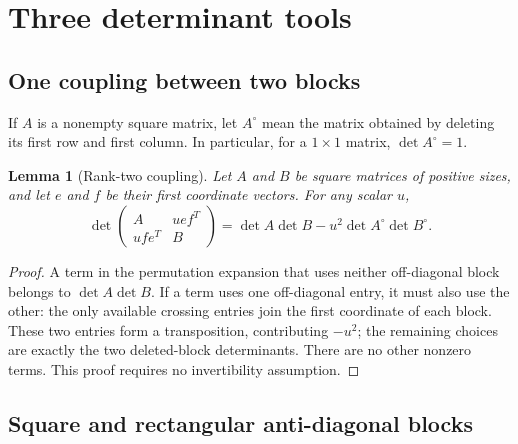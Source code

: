 \documentclass[11pt,a4paper]{article}
\numberwithin{equation}{section}
\newtheorem{lemma}[theorem]{Lemma}
\theoremstyle{definition}
\theoremstyle{remark}
\begin{document}
\section{Three determinant tools}\label{sec:tools}

\subsection{One coupling between two blocks}

If $A$ is a nonempty square matrix, let $A^{\circ}$ mean the matrix
obtained by deleting its first row and first column. In particular,
for a $1\times1$ matrix, $\det A^{\circ}=1$.

\begin{lemma}[Rank-two coupling]\label{lem:coupling}
Let $A$ and $B$ be square matrices of positive sizes, and let $e$ and $f$
be their first coordinate vectors. For any scalar $u$,
\begin{equation}\label{eq:coupling}
 \det\begin{pmatrix}A&u e f^T\\u f e^T&B\end{pmatrix}
 =\det A\det B-u^2\det A^{\circ}\det B^{\circ}.
\end{equation}
\end{lemma}
\begin{proof}
A term in the permutation expansion that uses neither off-diagonal
block belongs to $\det A\det B$. If a term uses one off-diagonal entry,
it must also use the other: the only available crossing entries join
the first coordinate of each block. These two entries form a
transposition, contributing $-u^2$; the remaining choices are exactly
the two deleted-block determinants. There are no other nonzero terms.
This proof requires no invertibility assumption.
\end{proof}

\subsection{Square and rectangular anti-diagonal blocks}
\end{document}
